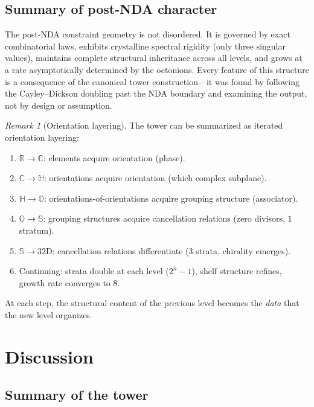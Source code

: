\documentclass[12pt,a4paper]{article}
\theoremstyle{definition}
\theoremstyle{remark}
\newtheorem{remark}[theorem]{Remark}
\newcommand{\R}{\mathbb{R}}
\newcommand{\C}{\mathbb{C}}
\newcommand{\HH}{\mathbb{H}}
\newcommand{\OO}{\mathbb{O}}
\newcommand{\Sed}{\mathbb{S}}
\begin{document}
\subsection{Summary of post-NDA character}

The post-NDA constraint geometry is not disordered. It is
governed by exact combinatorial laws, exhibits crystalline
spectral rigidity (only three singular values), maintains
complete structural inheritance across all levels, and grows at a
rate asymptotically determined by the octonions. Every feature
of this structure is a consequence of the canonical tower
construction---it was found by following the Cayley--Dickson
doubling past the NDA boundary and examining the output, not by
design or assumption.

\begin{remark}[Orientation layering]
\label{rem:orientation-layers}
The tower can be summarized as iterated orientation layering:
\begin{enumerate}[label=(\roman*), nosep]
  \item $\R \to \C$: elements acquire orientation (phase).
  \item $\C \to \HH$: orientations acquire orientation (which
  complex subplane).
  \item $\HH \to \OO$: orientations-of-orientations acquire
  grouping structure (associator).
  \item $\OO \to \Sed$: grouping structures acquire cancellation
  relations (zero divisors, $1$ stratum).
  \item $\Sed \to 32$D: cancellation relations differentiate
  ($3$ strata, chirality emerges).
  \item Continuing: strata double at each level ($2^n - 1$),
  shelf structure refines, growth rate converges to $8$.
\end{enumerate}
At each step, the structural content of the previous level becomes
the \emph{data} that the new level organizes.
\end{remark}


\section{Discussion}
\label{sec:discussion}

\subsection{Summary of the tower}
\end{document}
